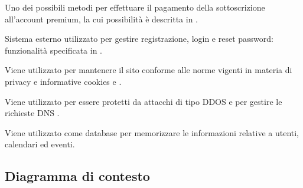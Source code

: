 \begin{listaPersonale}[ACO]{}
    Uno dei possibili metodi per effettuare il pagamento della sottoscrizione all'account premium, la cui possibilità è descritta in .

    Sistema esterno utilizzato  per gestire registrazione, login e reset password: funzionalità specificata in .

    Viene utilizzato per mantenere il sito conforme alle norme vigenti in materia di privacy e informative cookies  e .

    Viene utilizzato per essere protetti da attacchi di tipo DDOS e per gestire le richieste DNS .

    Viene utilizzato come database per memorizzare le informazioni relative a utenti, calendari ed eventi.

\end{listaPersonale}


\subsection{Diagramma di contesto}

